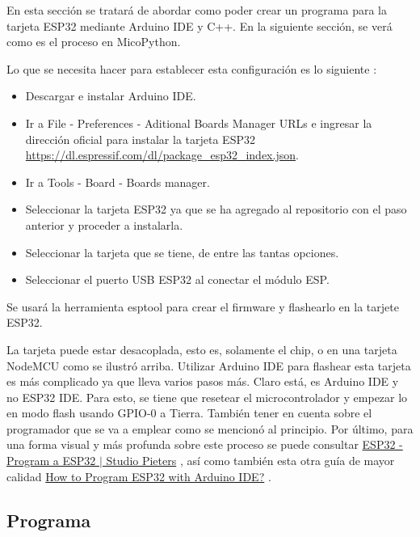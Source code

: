 \documentclass[conference]{IEEEtran}
\begin{document}
En esta sección se tratará de abordar como poder crear un programa para la
tarjeta ESP32 mediante Arduino IDE y C++. En la siguiente sección, se verá
como es el proceso en MicoPython.

\bigbreak

Lo que se necesita hacer para establecer esta configuración es lo siguiente
\cite{pieters-2022}:

\begin{itemize}
\item Descargar e instalar Arduino IDE.

\item Ir a File - Preferences - Aditional Boards Manager URLs e ingresar la
dirección oficial para instalar la tarjeta ESP32 \url{https://dl.espressif.com/dl/package_esp32_index.json}.

\item Ir a Tools - Board - Boards manager.

\item Seleccionar la tarjeta ESP32 ya que se ha agregado al repositorio con
el paso anterior y proceder a instalarla.

\item Seleccionar la tarjeta que se tiene, de entre las tantas opciones.

\item Seleccionar el puerto USB ESP32 al conectar el módulo ESP.
\end{itemize}

Se usará la herramienta esptool para crear el firmware y flashearlo en la
tarjete ESP32.

\bigbreak

La tarjeta puede estar desacoplada, esto es, solamente el chip, o en una
tarjeta NodeMCU como se ilustró arriba. Utilizar Arduino IDE para flashear
esta tarjeta es más complicado ya que lleva varios pasos más. Claro está, es
Arduino IDE y no ESP32 IDE. Para esto, se tiene que resetear el
microcontrolador y empezar lo en modo flash usando GPIO-0 a Tierra. También
tener en cuenta sobre el programador que se va a emplear como se mencionó al
principio. Por último, para una forma visual y más profunda sobre este
proceso se puede consultar
\href{https://www.studiopieters.nl/esp32-program-a-esp32}{ESP32 - Program a ESP32 $\mid$ Studio Pieters}
\cite{pieters-2022}, así como también esta otra guía de mayor calidad
\href{https://www.electronicshub.org/esp32-arduino-ide}{How to Program ESP32 with Arduino IDE?} \cite{teja-2021}.

\subsection{Programa}
\end{document}
